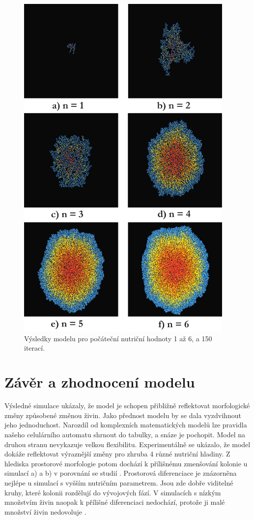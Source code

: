 \documentclass{article}
\begin{document}
\clearpage
\begin{figure}[ht]
\centering
\includegraphics[width=0.95\textwidth]{grid.jpg}
\caption{Výsledky modelu pro počáteční nutriční hodnoty 1 až 6, a 150 iterací.}
\label{grid}
\end{figure}
\clearpage

\section{Závěr a zhodnocení modelu}
Výsledné simulace ukázaly, že model je schopen přibližně reflektovat morfologické změny způsobené změnou živin. Jako přednost modelu by se dala vyzdvihnout jeho jednoduchost. Narozdíl od komplexních matematických modelů lze pravidla našeho celulárního automatu shrnout do tabulky, a snáze je pochopit. Model na druhou stranu nevykazuje velkou flexibilitu. Experimentálně se ukázalo, že model dokáže reflektovat výraznější změny pro zhruba 4 různé nutriční hladiny. Z hlediska prostorové morfologie potom dochází k přílišnému zmenšování kolonie u simulací a) a b) v porovnání se studií \cite{morphological}. Prostorová diferenciace je znázorněna nejlépe u simulací s vyšším nutričním parametrem. Jsou zde dobře viditelné kruhy, které kolonii rozdělují do vývojových fází. V simulacích s nízkým množstvím živin naopak k přílišné diferenciaci nedochází, protože ji malé množství živin nedovoluje \cite{differentiation}. 
\end{document}
